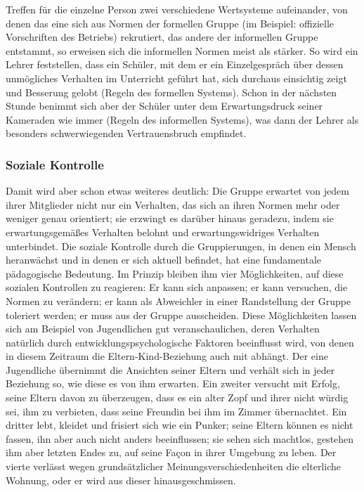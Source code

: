 \documentclass[12pt]{scrartcl}
\begin{document}
Treffen für die einzelne Person zwei verschiedene Wertsysteme aufeinander, von
denen das eine sich aus Normen der formellen Gruppe (im Beispiel: offizielle
Vorschriften des Betriebs) rekrutiert, das andere der informellen Gruppe
entstammt, so erweisen sich die informellen Normen meist als stärker. So wird
ein Lehrer feststellen, dass ein Schüler, mit dem er ein Einzelgespräch über
dessen unmögliches Verhalten im Unterricht geführt hat, sich durchaus
einsichtig zeigt und Besserung gelobt (Regeln des formellen Systems). Schon in
der nächsten Stunde benimmt sich aber der Schüler unter dem Erwartungsdruck
seiner Kameraden wie immer (Regeln des informellen Systems), was dann der
Lehrer als besonders schwerwiegenden Vertrauensbruch empfindet.

\subsubsection{Soziale Kontrolle}
Damit wird aber schon etwas weiteres deutlich: Die Gruppe erwartet von jedem
ihrer Mitglieder nicht nur ein Verhalten, das sich an ihren Normen mehr oder
weniger genau orientiert; sie erzwingt es darüber hinaus geradezu, indem sie
erwartungsgemäßes Verhalten belohnt und erwartungswidriges Verhalten
unterbindet. Die soziale Kontrolle durch die Gruppierungen, in denen ein Mensch
heranwächst und in denen er sich aktuell befindet, hat eine fundamentale
pädagogische Bedeutung. Im Prinzip bleiben ihm vier Möglichkeiten, auf diese
sozialen Kontrollen zu reagieren: Er kann sich anpassen; er kann versuchen, die
Normen zu verändern; er kann als Abweichler in einer Randstellung der Gruppe
toleriert werden; er muss aus der Gruppe ausscheiden. Diese Möglichkeiten
lassen sich am Beispiel von Jugendlichen gut veranschaulichen, deren Verhalten
natürlich durch entwicklungspsychologische Faktoren beeinflusst wird, von denen
in diesem Zeitraum die Eltern-Kind-Beziehung auch mit abhängt. Der eine
Jugendliche übernimmt die Ansichten seiner Eltern und verhält sich in jeder
Beziehung so, wie diese es von ihm erwarten. Ein zweiter versucht mit Erfolg,
seine Eltern davon zu überzeugen, dass es ein alter Zopf und ihrer nicht würdig
sei, ihm zu verbieten, dass seine Freundin bei ihm im Zimmer übernachtet. Ein
dritter lebt, kleidet und frisiert sich wie ein Punker; seine Eltern können es
nicht fassen, ihn aber auch nicht anders beeinflussen; sie sehen sich machtlos,
gestehen ihm aber letzten Endes zu, auf seine Façon in ihrer Umgebung zu leben.
Der vierte verlässt wegen grundsätzlicher Meinungsverschiedenheiten die
elterliche Wohnung, oder er wird aus dieser hinausgeschmissen.
\end{document}
